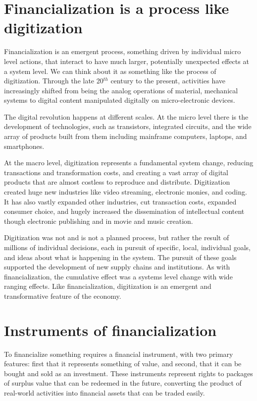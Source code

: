 \section{Financialization is a process like digitization}
Financialization is an emergent process, something %
driven by individual micro level actions, that interact to have much larger, potentially unexpected effects at a system level. We can think about it as something like the process of \gls{digitization}. 
Through the late 20$^{th}$ century to the present, activities have increasingly shifted from being the analog operations of material, mechanical systems  to digital content manipulated digitally on micro-electronic devices. 

The digital revolution happens at different scales. At the micro level there is the development of technologies, such as transistors, integrated circuits, and the wide array of products built from them including mainframe computers, laptops, and smartphones.  

At the macro level, digitization represents a fundamental system change, reducing transactions and transformation costs, and creating a vast array of digital products that are almost costless to reproduce and distribute. Digitization created huge new industries like video streaming, electronic monies, and coding. It has also vastly expanded other industries, %
cut transaction costs, expanded consumer choice, %
and hugely increased the dissemination of intellectual content though electronic publishing and in movie and music creation.   

Digitization was not and is not a planned process, but rather the result of millions of individual decisions, each in pursuit of specific, local, individual goals, and ideas about what is happening in the system. The pursuit of these goals supported the development of  new supply chains and institutions. As with financialization, the cumulative effect was a systems level change with wide ranging effects.  Like  financialization, digitization is an emergent and transformative feature of the economy.

\section{Instruments of financialization }
To financialize something requires a \gls{financial instrument}, with two primary features: first that it represents something of value, and second, that it can be bought and sold as an investment. These instruments represent rights to packages of surplus value that can be redeemed in the future, converting the product of real-world activities into financial assets that can be traded easily. 


